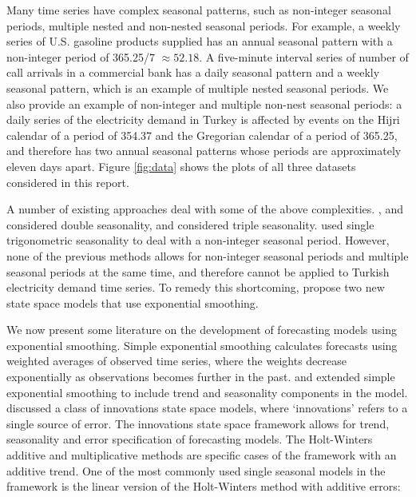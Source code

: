 \documentclass{uwstat572}
\begin{document}
\hspace{4ex}Many time series have complex seasonal patterns, such as non-integer seasonal periods, multiple nested and non-nested seasonal periods. For example, a weekly series of U.S. gasoline products supplied has an annual seasonal pattern with a non-integer period of 365.25/7 $\approx 52.18$. A five-minute interval series of number of call arrivals in a commercial bank has a daily seasonal pattern and a weekly seasonal pattern, which is an example of multiple nested seasonal periods. We also provide an example of non-integer and multiple non-nest seasonal periods: a daily series of the electricity demand in Turkey is affected by events on the Hijri calendar of a period of 354.37 and the Gregorian calendar of a period of 365.25, and therefore has two annual seasonal patterns whose periods are approximately eleven days apart. Figure \ref{fig:data} shows the plots of all three datasets considered in this report.

A number of existing approaches deal with some of the above complexities. \citet{pedregal2006modulated}, \citet{harvey1993forecasting} and \citet{taylor2003short} considered double seasonality, and \citet{taylor2010triple} considered triple seasonality. \citet{harvey1997modeling} used single trigonometric seasonality to deal with a non-integer seasonal period. However, none of the previous methods allows for non-integer seasonal periods and multiple seasonal periods at the same time, and therefore cannot be applied to Turkish electricity demand time series. To remedy this shortcoming, \citet{de2011forecasting} propose two new state space models that use exponential smoothing. 

We now present some literature on the development of forecasting models using exponential smoothing. Simple exponential smoothing calculates forecasts using weighted averages of observed time series, where the weights decrease exponentially as observations becomes further in the past. \citet{holt1957forecasting} and \citet{winters1960forecasting} extended simple exponential smoothing to include trend and seasonality components in the model. \citet{hyndman2002state} discussed a class of innovations state space models, where `innovations' refers to a single source of error. The innovations state space framework allows for trend, seasonality and error specification of forecasting models. The Holt-Winters additive and multiplicative methods are specific cases of the framework with an additive trend. One of the most commonly used single seasonal models in the framework is the linear version of the Holt-Winters method with additive errors:
\end{document}

